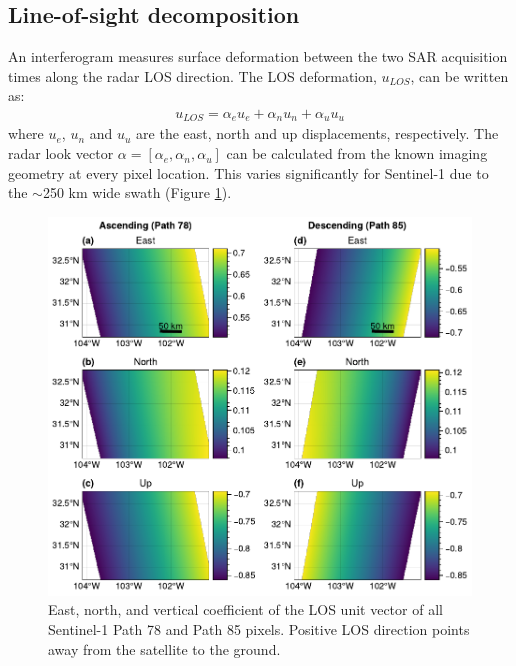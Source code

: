 

\subsection{Line-of-sight decomposition}
\label{sec:ch4-insar-decomp}


An interferogram measures surface deformation between the two SAR acquisition times along the radar LOS direction. The LOS deformation, $u_{LOS}$, can be written as: 
\begin{align}
	u_{LOS}= \alpha_{e} u_{e} + \alpha_{n} u_{n} + \alpha_{u} u_{u}
\end{align}
where $u_{e}$, $u_{n}$ and $u_{u}$ are the east, north and up displacements, respectively. The radar look vector $\alpha = [\alpha_e, \alpha_n, \alpha_u]$ can be calculated from the known imaging geometry at every pixel location. This varies significantly for Sentinel-1 due to the $ \sim$250 km wide swath (Figure \ref{fig:los-map}). 


\begin{figure}
	\centering
	\includegraphics[width=.98\textwidth]{figures/chapter2-sar/figure_los_enu_coeffs-2col.pdf}
	\caption[East, north, and vertical coefficients of Sentinel-1 LOS vectors]{East, north, and vertical coefficient of the LOS unit vector of all Sentinel-1 Path 78 and Path 85 pixels. Positive LOS direction points away from the satellite to the ground.
	}
	\label{fig:los-map}
\end{figure}


